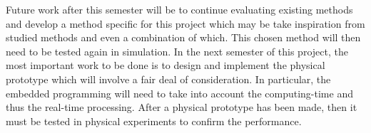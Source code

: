 \documentclass[notitlepage]{report}
\begin{document}
Future work after this semester will be to continue evaluating existing methods and develop a method specific for this project which may be take inspiration from studied methods and even a combination of which. This chosen method will then need to be tested again in simulation. In the next semester of this project, the most important work to be done is to design and implement the physical prototype which will involve a fair deal of consideration. In particular, the embedded programming will need to take into account the computing-time and thus the real-time processing. After a physical prototype has been made, then it must be tested in physical experiments to confirm the performance.

%
\end{document}
